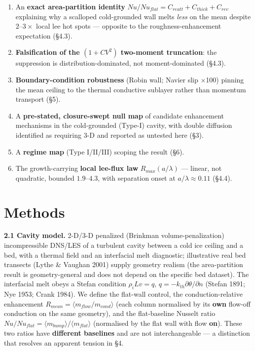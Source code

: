 \documentclass[tc, manuscript]{copernicus}
\begin{document}
\begin{enumerate}
\item An \textbf{exact area-partition identity} $Nu/Nu_{flat} = C_{reatt} + C_{thick} + C_{rev}$ explaining why a scalloped cold-grounded wall melts \emph{less} on the mean despite $2\mbox{--}3\times $ local lee hot spots — opposite to the roughness-enhancement expectation (§4.3).
\item \textbf{Falsification of the $(1+CV^{2})$ two-moment truncation}: the suppression is distribution-dominated, not moment-dominated (§4.3).
\item \textbf{Boundary-condition robustness} (Robin wall; Navier slip \ensuremath{\times}100) pinning the mean ceiling to the thermal conductive sublayer rather than momentum transport (§5).
\item A \textbf{pre-stated, closure-swept null map} of candidate enhancement mechanisms in the cold-grounded (Type-I) cavity, with double diffusion identified as requiring 3-D and reported as untested here (§3).
\item A \textbf{regime map} (Type I/II/III) scoping the result (§6).
\item The growth-carrying \textbf{local lee-flux law} $R_{max}(a/\lambda )$ — linear, not quadratic, bounded $1.9\mbox{--}4.3$, with separation onset at $a/\lambda \approx 0.11$ (§4.4).
\end{enumerate}

\section{Methods}

\textbf{2.1 Cavity model.} 2-D/3-D penalized (Brinkman volume-penalization) incompressible DNS/LES of a turbulent cavity between a cold ice ceiling and a bed, with a thermal field and an interfacial melt diagnostic; illustrative real bed transects (Lythe \& Vaughan 2001) supply geometry realism (the area-partition result is geometry-general and does not depend on the specific bed dataset). The interfacial melt obeys a Stefan condition $\rho _{i} L v = q$, $q = -k_{th} \partial \theta /\partial n$ (Stefan 1891; Nye 1953; Crank 1984). We define the flat-wall control, the conduction-relative enhancement $R_{mean} = \langle m_{flow}/m_{cond}\rangle $ (each column normalised by its \textbf{own} flow-off conduction on the same geometry), and the flat-baseline Nusselt ratio $Nu/Nu_{flat} = \langle m_{bump}\rangle /\langle m_{flat}\rangle $ (normalised by the flat wall with flow \textbf{on}). These two ratios have \textbf{different baselines} and are not interchangeable — a distinction that resolves an apparent tension in §4.
\end{document}
